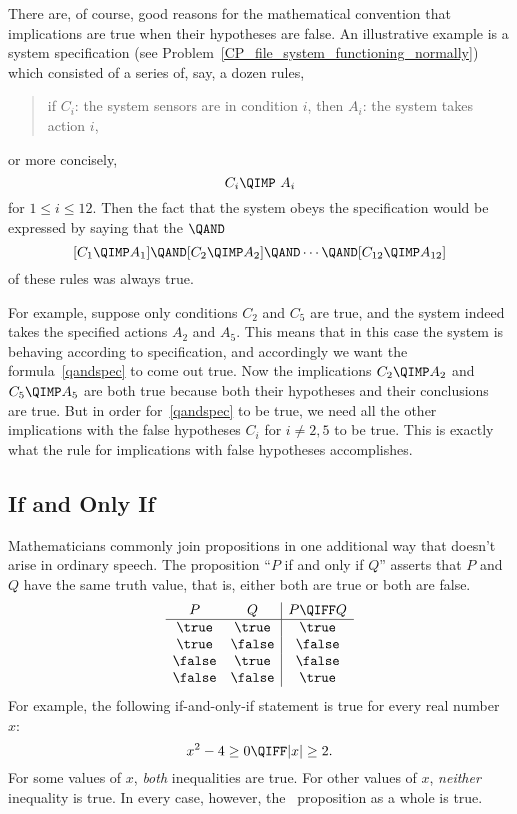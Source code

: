 There are, of course, good reasons for the mathematical convention
that implications are true when their hypotheses are false.  An
illustrative example is a system specification (see
Problem~\ref{CP_file_system_functioning_normally}) which consisted of
a series of, say, a dozen rules,
\begin{quote}
if $C_i$: the system sensors are in condition $i$, then $A_i$: the
system takes action $i$,
\end{quote}
or more concisely,
\[
C_i \QIMP\ A_i
\]
for $1 \leq i \leq 12$.  Then the fact that the system obeys the
specification would be expressed by saying that the $\QAND$
\begin{equation}\label{qandspec}
[C_1 \QIMP A_1] \QAND [C_2 \QIMP A_2] \QAND \cdots \QAND [C_{12} \QIMP A_{12}]
\end{equation}
of these rules was always true.

For example, suppose only conditions $C_2$ and $C_5$ are true, and the
system indeed takes the specified actions $A_2$ and $A_5$.  This means
that in this case the system is behaving according to specification,
and accordingly we want the formula~\eqref{qandspec} to come out true.
Now the implications $C_2 \QIMP A_2$ and $C_5 \QIMP A_5$ are both
true because both their hypotheses and their conclusions are true.
But in order for~\eqref{qandspec} to be true, we need all the other
implications with the false hypotheses $C_i$ for $i \neq 2, 5$ to be
true.  This is exactly what the rule for implications with false
hypotheses accomplishes.

\subsection{If and Only If}

Mathematicians commonly join propositions in one additional way that
doesn't arise in ordinary speech.  The proposition ``$P$ if and only
if $Q$'' asserts that $P$ and $Q$ have the same truth value, that is,
either both are true or both are false.
%
\[
\begin{array}{cc|c}
P & Q & P \QIFF Q \\ \hline
\true & \true & \true \\
\true & \false & \false \\
\false & \true & \false \\
\false & \false & \true
\end{array}
\]
For example, the following if-and-only-if statement is true for every real
number $x$:
%
\[
x^2 - 4 \geq 0 \QIFF |x| \geq 2.
\]
%
For some values of $x$, \textit{both} inequalities are true.  For
other values of $x$, \textit{neither} inequality is true.  In every
case, however, the \QIFF\ proposition as a whole is true.

